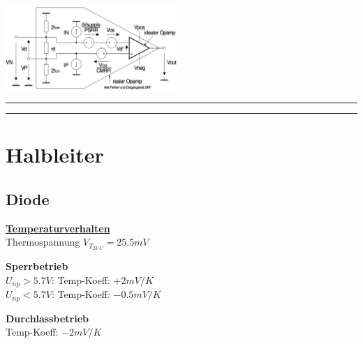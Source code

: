         \begin{minipage}[b]{6.5cm}
            \includegraphics[width=6.5cm]{./bilder/OPAmpAlleFehler}
        \end{minipage}
\hrule
\hrule

	\section{Halbleiter}
        \subsection{Diode}
            \underline{\bf Temperaturverhalten}\\
            Thermospannung
            \hspace{15.3mm} $V_{T_{23^\circ C}} = 25.5 mV$ \\
            \begin{minipage}[T]{9cm}
                {\bf Sperrbetrieb}\\
                $U_{np} > 5.7V$: Temp-Koeff: $+2 mV/K$\\
                $U_{np} < 5.7V$: Temp-Koeff: $-0.5 mV/K$\\
            \end{minipage}
            \begin{minipage}{9cm}
                {\bf Durchlassbetrieb}\\
                Temp-Koeff: $-2 mV/K$\\
            \end{minipage}
            

